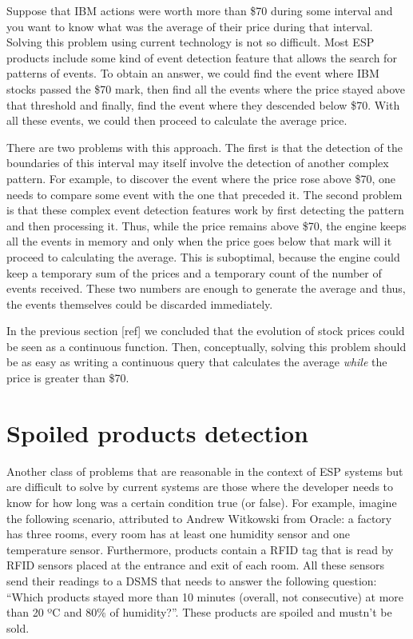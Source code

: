 \documentclass{report}
\begin{document}
Suppose that IBM actions were worth more than \$70 during some
interval and you want to know what was the average of their price
during that interval. Solving this problem using current technology is
not so difficult. Most ESP products include some kind of event
detection feature that allows the search for patterns of events. To
obtain an answer, we could find the event where IBM stocks passed the
\$70 mark, then find all the events where the price stayed above that
threshold and finally, find the event where they descended below
\$70. With all these events, we could then proceed to calculate the
average price.

There are two problems with this approach. The first is that the
detection of the boundaries of this interval may itself involve the
detection of another complex pattern. For example, to discover the
event where the price rose above \$70, one needs to compare some event
with the one that preceded it. The second problem is that these
complex event detection features work by first detecting the pattern
and then processing it. Thus, while the price remains above \$70, the
engine keeps all the events in memory and only when the price goes
below that mark will it proceed to calculating the average. This is
suboptimal, because the engine could keep a temporary sum of the
prices and a temporary count of the number of events received. These
two numbers are enough to generate the average and thus, the events
themselves could be discarded immediately.

In the previous section [ref] we concluded that the evolution of stock
prices could be seen as a continuous function. Then, conceptually,
solving this problem should be as easy as writing a continuous query
that calculates the average \emph{while} the price is greater than
\$70.

\section{Spoiled products detection}
Another class of problems that are reasonable in the context of ESP
systems but are difficult to solve by current systems are those where
the developer needs to know for how long was a certain condition true
(or false). For example, imagine the following scenario, attributed to
Andrew Witkowski from Oracle: a factory has three rooms, every room
has at least one humidity sensor and one temperature
sensor. Furthermore, products contain a RFID tag that is read by RFID
sensors placed at the entrance and exit of each room. All these
sensors send their readings to a DSMS that needs to answer the
following question: ``Which products stayed more than 10 minutes
(overall, not consecutive) at more than 20 ºC and 80\% of
humidity?''. These products are spoiled and mustn't be sold.
\end{document}
